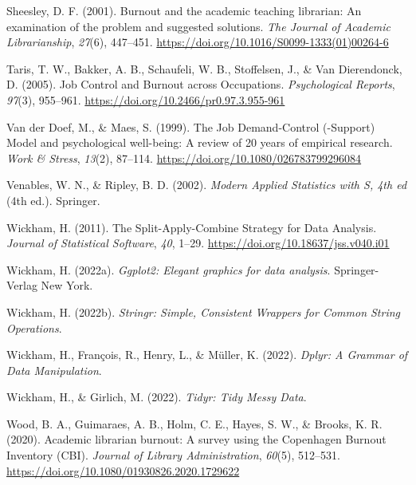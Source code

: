 \documentclass[
  twocolumn]{article}
\newlength{\cslhangindent}
\newenvironment{CSLReferences}[2] %
 {\begin{list}{}{%
  \setlength{\itemindent}{0pt}
  \setlength{\leftmargin}{0pt}
  \setlength{\parsep}{0pt}
  \ifodd #1
   \setlength{\leftmargin}{\cslhangindent}
   \setlength{\itemindent}{-1\cslhangindent}
  \fi
  \setlength{\itemsep}{#2\baselineskip}}}
 {\end{list}}
\begin{document}
\begin{CSLReferences}{1}{0}
Sheesley, D. F. (2001). Burnout and the academic teaching librarian:
{An} examination of the problem and suggested solutions. \emph{The
Journal of Academic Librarianship}, \emph{27}(6), 447--451.
\url{https://doi.org/10.1016/S0099-1333(01)00264-6}

Taris, T. W., Bakker, A. B., Schaufeli, W. B., Stoffelsen, J., \& Van
Dierendonck, D. (2005). Job {Control} and {Burnout} across
{Occupations}. \emph{Psychological Reports}, \emph{97}(3), 955--961.
\url{https://doi.org/10.2466/pr0.97.3.955-961}

Van der Doef, M., \& Maes, S. (1999). The {Job Demand-Control}
(-{Support}) {Model} and psychological well-being: {A} review of 20
years of empirical research. \emph{Work \& Stress}, \emph{13}(2),
87--114. \url{https://doi.org/10.1080/026783799296084}

Venables, W. N., \& Ripley, B. D. (2002). \emph{Modern {Applied
Statistics} with {S}, 4th ed} (4th ed.). Springer.

Wickham, H. (2011). The {Split-Apply-Combine Strategy} for {Data
Analysis}. \emph{Journal of Statistical Software}, \emph{40}, 1--29.
\url{https://doi.org/10.18637/jss.v040.i01}

Wickham, H. (2022a). \emph{Ggplot2: {Elegant} graphics for data
analysis}. Springer-Verlag New York.

Wickham, H. (2022b). \emph{Stringr: {Simple}, {Consistent Wrappers} for
{Common String Operations}}.

Wickham, H., François, R., Henry, L., \& Müller, K. (2022). \emph{Dplyr:
{A Grammar} of {Data Manipulation}}.

Wickham, H., \& Girlich, M. (2022). \emph{Tidyr: {Tidy Messy Data}}.

Wood, B. A., Guimaraes, A. B., Holm, C. E., Hayes, S. W., \& Brooks, K.
R. (2020). Academic librarian burnout: {A} survey using the {Copenhagen
Burnout Inventory} ({CBI}). \emph{Journal of Library Administration},
\emph{60}(5), 512--531.
\url{https://doi.org/10.1080/01930826.2020.1729622}

\end{CSLReferences}
\end{document}
